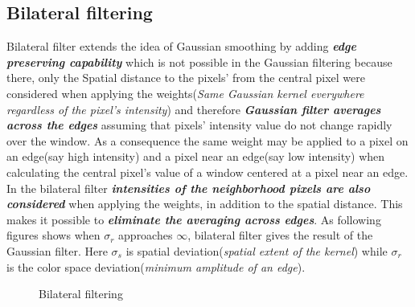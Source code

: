 \documentclass[a4paper,10pt]{article}%
\begin{document}
\subsection{Bilateral filtering}

Bilateral filter extends the idea of Gaussian smoothing by adding \textbf{\textit{edge preserving capability}} which is not possible in the Gaussian filtering because there, only the Spatial distance to the pixels' from the central pixel were considered when applying the weights(\textit{Same Gaussian kernel everywhere regardless of the pixel's intensity}) and therefore \textbf{\textit{Gaussian filter averages across the edges}} assuming that pixels' intensity value do not change rapidly over the window. As a consequence the same weight may be applied to a pixel on an edge(say high intensity) and a pixel near an edge(say low intensity) when calculating the central pixel's value of a window centered at a pixel near an edge.\\

In the bilateral filter \textbf{\textit{intensities of the neighborhood pixels are also considered}} when applying the weights, in addition to the spatial distance. This makes it possible to \textbf{\textit{eliminate the averaging across edges}}. As following figures shows when $\sigma_r$ approaches $\infty$, bilateral filter gives the result of the Gaussian filter. Here $\sigma_s$ is spatial deviation(\textit{spatial extent of the kernel}) while $\sigma_r$ is the color space deviation(\textit{minimum amplitude of an edge}).
\begin{figure}[!h]
	\centering
	\caption{Bilateral filtering}
\end{figure}
\end{document}
